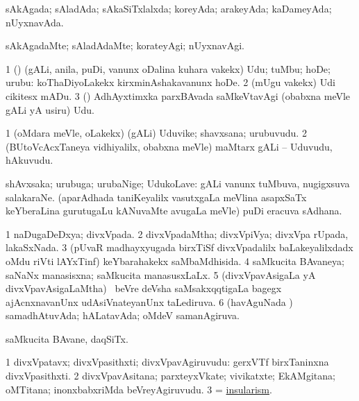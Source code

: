 \bentry
{}
\gl{\gu}
\bmng
sAkAgada; sAladAda; sAkaSiTxlalxda; koreyAda; arakeyAda; kaDameyAda; nUyxnavAda. 
\emng
\eentry

\bentry
{}
\gl{\kirxvi}
\bmng
sAkAgadaMte; sAladAdaMte; korateyAgi; nUyxnavAgi. 
\emng
\eentry

\bentry
{}
\gl{\sakirx}
\bmng
\bnum
\num{1} (\veYshA) (gALi, anila, puDi, \mo vanunx oDalina kuhara \mo vakekx) Udu; tuMbu; hoDe; urubu:  koThaDiyoLakekx kirxminAshakavanunx hoDe. 
\num{2} (mUgu \mo vakekx) Udi cikitesx mADu. 
\num{3} (\deVva) AdhAyxtimxka parxBAvada saMkeVtavAgi (obabxna meVle gALi yA usiru) Udu. 
\enum
\emng
\eentry

\bentry
{}
\gl{\nA}
\bmng
\bnum
\num{1} (oMdara meVle, oLakekx) (gALi) Uduvike; shavxsana; urubuvudu. 
\num{2} (BUtoVcAcxTaneya vidhiyalilx, obabxna meVle) maMtarx gALi -- Uduvudu, hAkuvudu. 
\enum
\emng
\eentry

\bentry
{}
\gl{\nA}
\bmng
shAvxsaka; urubuga; urubaNige; UdukoLave: 
\banum
{} gALi \mo vanunx tuMbuva, nugigxsuva salakaraNe. 
 (aparAdhada taniKeyalilx vasutxgaLa meVlina asapxSaTx keYberaLina gurutugaLu kANuvaMte avugaLa meVle) puDi eracuva sAdhana. 
\eanum
\emng
\eentry

\bentry
{}
\gl{\gu}
\bmng
\bnum
\num{1} naDugaDeDxya; divxVpada. 
\num{2} divxVpadaMtha; divxVpiVya; divxVpa rUpada, lakaSxNada. 
\num{3} (pUvaR madhayxyugada birxTiSf divxVpadalilx baLakeyalilxdadx oMdu riVti lAYxTinf) keYbarahakekx saMbaMdhisida. 
\num{4} saMkucita BAvaneya; saNaNx manasisxna; saMkucita manasusxLaLx. 
\num{5} (divxVpavAsigaLa yA divxVpavAsigaLaMtha) \kanmu\ beVre deVsha saMsakxqqtigaLa bagegx ajAcnxnavanUnx udAsiVnateyanUnx taLediruva. 
\num{6} (havAguNada \vi) samadhAtuvAda; hALatavAda; oMdeV samanAgiruva. 
\enum
\emng
\eentry

\bentry
{}
\gl{\nA}
\bmng
saMkucita BAvane, daqSiTx. 
\emng
\eentry

\bentry
{}
\gl{\nA}
\bmng
\bnum
\num{1} divxVpatavx; divxVpasithxti; divxVpavAgiruvudu:  gerxVTf birxTaninxna divxVpasithxti. 
\num{2} divxVpavAsitana; parxteyxVkate; vivikatxte; EkAMgitana; oMTitana; inonxbabxriMda beVreyAgiruvudu. 
\num{3} = \hyperlink{insularism}{insularism}. 
\enum
\emng
\eentry

